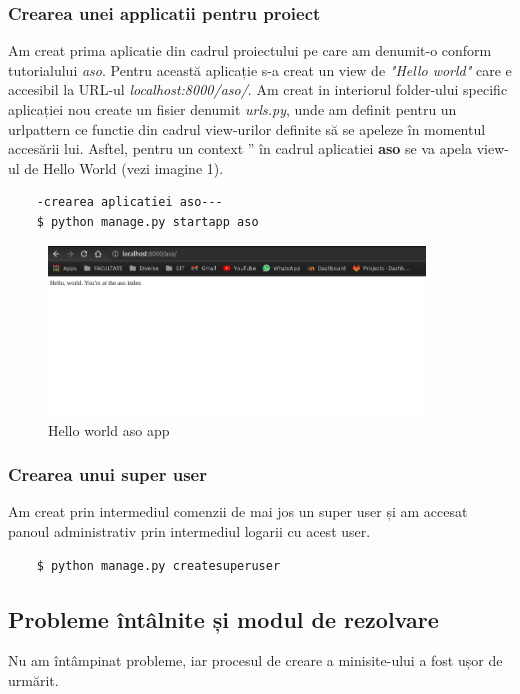 \subsubsection{Crearea unei applicatii pentru proiect}
\hspace{\parindent} Am creat prima aplicatie din cadrul proiectului pe care am denumit-o conform tutorialului \textit{aso}. Pentru această aplicație s-a creat un view de \textit{"Hello world"} care e accesibil la URL-ul \textit{localhost:8000/aso/}. Am creat in interiorul folder-ului specific aplicației nou  create un fisier denumit \textit{urls.py}, unde am definit pentru un urlpattern ce functie din cadrul view-urilor definite să se apeleze în momentul accesării lui. Asftel, pentru un context '' în cadrul aplicatiei \textbf{aso} se va apela view-ul de Hello World (vezi imagine 1). 
\begin{verbatim}
    -crearea aplicatiei aso---
    $ python manage.py startapp aso
\end{verbatim}

\begin{figure}[htp]
    \centering
    \includegraphics[width=10cm]{text/images/helloworld.png}
    \caption{Hello world aso app}
    \label{fig:galaxy}
\end{figure}

\subsubsection{Crearea unui super user}
Am creat prin intermediul comenzii de mai jos un super user și am accesat panoul administrativ prin intermediul logarii cu acest user. 
\begin{verbatim}
    $ python manage.py createsuperuser
\end{verbatim}
\vspace{0.75cm}

\subsection{Probleme întâlnite și modul de rezolvare}
\hspace{\parindent} Nu am întâmpinat probleme, iar procesul de creare a minisite-ului a fost ușor de urmărit. 
